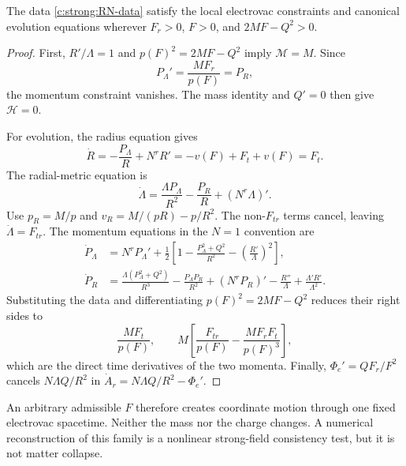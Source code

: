\begin{proposition}
The data \eqref{c:strong:RN-data} satisfy the local electrovac constraints and canonical evolution equations wherever $F_r>0$, $F>0$, and $2MF-Q^2>0$.
\end{proposition}
\begin{proof}
First, $R'/\Lambda=1$ and $p(F)^2=2MF-Q^2$ imply $\mathcal M=M$. Since
\begin{equation}
 P_\Lambda'=\frac{MF_r}{p(F)}=P_R,
\end{equation}
the momentum constraint vanishes. The mass identity and $Q'=0$ then give $\mathcal H=0$.

For evolution, the radius equation gives
\begin{equation}
 \dot R=-\frac{P_\Lambda}R+N^rR'
        =-v(F)+F_t+v(F)=F_t.
\end{equation}
The radial-metric equation is
\begin{equation}
 \dot\Lambda=\frac{\Lambda P_\Lambda}{R^2}
             -\frac{P_R}R+(N^r\Lambda)'.
\end{equation}
Use $p_R=M/p$ and $v_R=M/(pR)-p/R^2$. The non-$F_{tr}$ terms cancel, leaving $\dot\Lambda=F_{tr}$. The momentum equations in the $N=1$ convention are
\begin{align}
 \dot P_\Lambda&=N^rP_\Lambda'
 +\frac12\left[1-\frac{P_\Lambda^2+Q^2}{R^2}
                 -\left(\frac{R'}\Lambda\right)^2\right],\\
 \dot P_R&=\frac{\Lambda(P_\Lambda^2+Q^2)}{R^3}
 -\frac{P_\Lambda P_R}{R^2}+(N^rP_R)'
 -\frac{R''}\Lambda+\frac{\Lambda'R'}{\Lambda^2}.
\end{align}
Substituting the data and differentiating $p(F)^2=2MF-Q^2$ reduces their right sides to
\begin{equation}
 \frac{MF_t}{p(F)},\qquad
 M\left[\frac{F_{tr}}{p(F)}
       -\frac{MF_rF_t}{p(F)^3}\right],
\end{equation}
which are the direct time derivatives of the two momenta. Finally,
$\Phi_e'=QF_r/F^2$ cancels $N\Lambda Q/R^2$ in
$\dot A_r=N\Lambda Q/R^2-\Phi_e'$.
\end{proof}

An arbitrary admissible $F$ therefore creates coordinate motion through one fixed electrovac spacetime. Neither the mass nor the charge changes. A numerical reconstruction of this family is a nonlinear strong-field consistency test, but it is not matter collapse.

